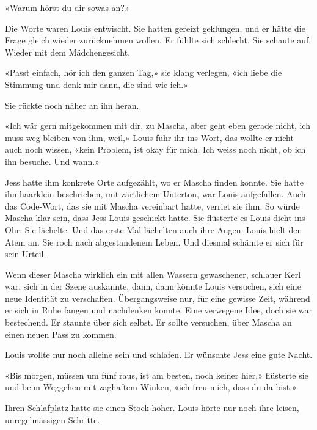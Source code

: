 «Warum hörst du dir sowas an?»

Die Worte waren Louis entwischt. Sie hatten gereizt geklungen, und er
hätte die Frage gleich wieder zurücknehmen wollen. Er fühlte sich
schlecht.
Sie schaute auf. Wieder mit dem Mädchengesicht.

«Passt einfach, hör ich den ganzen Tag,» sie klang verlegen, «ich liebe
die Stimmung und denk mir dann, die sind wie ich.»

Sie rückte noch näher an ihn heran.

«Ich wär gern mitgekommen mit dir, zu Mascha, aber geht eben gerade
nicht, ich muss weg bleiben von ihm, weil,» Louis fuhr ihr ins Wort, das
wollte er nicht auch noch wissen, «kein Problem, ist okay für mich. Ich
weiss noch nicht, ob ich ihn besuche. Und wann.»

Jess hatte ihm konkrete Orte aufgezählt, wo er Mascha finden konnte. Sie
hatte ihn haarklein beschrieben, mit zärtlichem Unterton, war Louis 
aufgefallen.
Auch das Code-Wort, das sie mit Mascha vereinbart hatte, verriet sie
ihm. So würde Mascha klar sein, dass Jess Louis geschickt hatte. Sie
flüsterte es Louis dicht ins Ohr. Sie lächelte. Und das erste Mal
lächelten auch ihre Augen.
Louis hielt den Atem an. Sie roch nach abgestandenem Leben. Und diesmal
schämte er sich für sein Urteil.

\sectionbreak

Wenn dieser Mascha wirklich ein mit allen Wassern gewaschener, schlauer
Kerl war, sich in der Szene auskannte, dann, dann könnte Louis
versuchen, sich eine neue Identität zu verschaffen. Übergangsweise nur, 
für eine gewisse Zeit, während er sich in Ruhe fangen und nachdenken
konnte. Eine verwegene Idee, doch sie war bestechend. Er staunte
über sich selbst. Er sollte versuchen, über Mascha an einen neuen Pass
zu kommen.

Louis wollte nur noch alleine sein und schlafen. Er wünschte Jess eine
gute Nacht.

«Bis morgen, müssen um fünf raus, ist am besten, noch keiner hier,»
flüsterte sie und beim Weggehen mit zaghaftem Winken, «ich freu mich, dass du da
bist.»

Ihren Schlafplatz hatte sie einen Stock höher. Louis hörte nur noch ihre
leisen, unregelmässigen Schritte.
